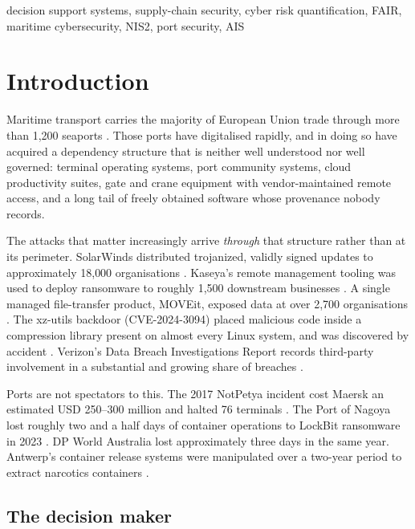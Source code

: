 \documentclass[conference]{IEEEtran}
\begin{document}
\begin{IEEEkeywords}
decision support systems, supply-chain security, cyber risk quantification, FAIR,
maritime cybersecurity, NIS2, port security, AIS
\end{IEEEkeywords}

\section{Introduction}

Maritime transport carries the majority of European Union trade through more than
1{,}200 seaports \cite{enisa2019}. Those ports have digitalised rapidly, and in
doing so have acquired a dependency structure that is neither well understood nor
well governed: terminal operating systems, port community systems, cloud
productivity suites, gate and crane equipment with vendor-maintained remote access,
and a long tail of freely obtained software whose provenance nobody records.

The attacks that matter increasingly arrive \emph{through} that structure rather
than at its perimeter. SolarWinds distributed trojanized, validly signed updates to
approximately 18{,}000 organisations \cite{solarwinds}. Kaseya's remote management
tooling was used to deploy ransomware to roughly 1{,}500 downstream businesses
\cite{kaseya}. A single managed file-transfer product, MOVEit, exposed data at over
2{,}700 organisations \cite{moveit}. The xz-utils backdoor (CVE-2024-3094) placed
malicious code inside a compression library present on almost every Linux system,
and was discovered by accident \cite{xzutils}. Verizon's Data Breach Investigations
Report records third-party involvement in a substantial and growing share of
breaches \cite{dbir2025}.

Ports are not spectators to this. The 2017 NotPetya incident cost Maersk an
estimated USD 250--300 million and halted 76 terminals \cite{maersk}. The Port of
Nagoya lost roughly two and a half days of container operations to LockBit
ransomware in 2023 \cite{nagoya}. DP World Australia lost approximately three days
in the same year. Antwerp's container release systems were manipulated over a
two-year period to extract narcotics containers \cite{enisa2019}.

\subsection{The decision maker}
\end{document}
